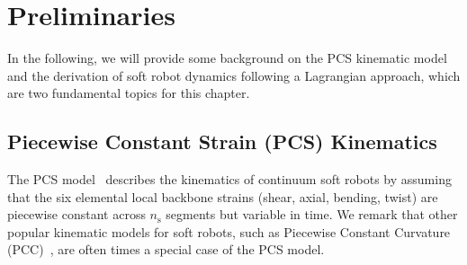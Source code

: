 \section{Preliminaries}
In the following, we will provide some background on the \gls{PCS} kinematic model and the derivation of soft robot dynamics following a Lagrangian approach, which are two fundamental topics for this chapter.

\subsection{Piecewise Constant Strain (PCS) Kinematics}\label{sec:pcsregression:pcs_model}
The \gls{PCS} model~\citep{renda2018discrete} describes the kinematics of continuum soft robots by assuming that the six elemental local backbone strains (shear, axial, bending, twist) are piecewise constant across $n_\mathrm{s}$ segments but variable in time.
We remark that other popular kinematic models for soft robots, such as Piecewise Constant Curvature (PCC)~\citep{webster2010design}, are often times a special case of the \gls{PCS} model.

